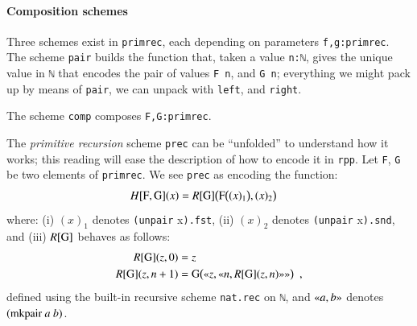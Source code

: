 \documentclass[preprint]{elsarticle}
\theoremstyle{remark}
\begin{document}
\paragraph{Composition schemes}
Three schemes exist in \lstinline|primrec|, each depending on parameters \lstinline|f,g:primrec|.
The scheme \lstinline|pair| builds the function that, taken a value \lstinline|n:ℕ|, gives the unique value in \lstinline|ℕ| that encodes the pair of values \lstinline|F n|, and \lstinline|G n|; everything we might pack up by means of \lstinline|pair|, we can unpack with \lstinline|left|, and \lstinline|right|.

The scheme \lstinline|comp| composes \lstinline|F,G:primrec|.

The \emph{primitive recursion} scheme \lstinline|prec| can be ``unfolded'' to understand how it works; this reading will ease the description of how to encode it in \lstinline|rpp|.
Let \lstinline|F|, \lstinline|G| be two elements of \lstinline|primrec|. We see \lstinline|prec| as encoding the function:
\begin{align}
\label{align:function H}
H[\mbox{\lstinline|F|},\mbox{\lstinline|G|}](x) & =
R[\mbox{\lstinline|G|}]\big( \mbox{\lstinline|F|} \big((x)_1 \big) , (x)_2 \big)
\end{align}
where:
(i) $(x)_1$ denotes \lstinline|(unpair| x\lstinline|).fst|,
(ii) $(x)_2$ denotes \lstinline|(unpair| x\lstinline|).snd|,
and
(iii) $R [\mbox{\lstinline|G|}] $ behaves as follows:
\begin{equation}
\label{equation:function R}
\begin{aligned}
    R[\mbox{\lstinline|G|}](z,0) & = z \\
    R[\mbox{\lstinline|G|}](z,n+1) &
    = \mbox{\lstinline|G|} \big(
      \gl z, \gl n, R[\mbox{\lstinline|G|}](z,n) \gr \gr
      \big)
   \enspace ,
\end{aligned}
\end{equation}
defined using the built-in recursive scheme \lstinline|nat.rec| on \lstinline|ℕ|, and $ \gl a, b \gr $ denotes $ (\mbox{\lstinline|mkpair|}\ a\ b) $.

\end{document}
